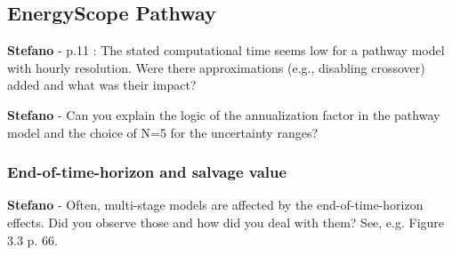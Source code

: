 \documentclass[12pt,a4paper]{article}
\begin{document}
\subsection{EnergyScope Pathway}
\label{ESPathway}
\begin{mdframed}[style=comment] %
{\color{orange} \textbf{Stefano}} - p.11 : The stated computational time seems low for a pathway model with hourly resolution. Were there approximations (e.g., disabling crossover) added and what was their impact?\end{mdframed}

\noindent 

\begin{mdframed}[style=manuscript] %

\end{mdframed}

\begin{mdframed}[style=comment] %
{\color{orange} \textbf{Stefano}} - Can you explain the logic of the annualization factor in the pathway model and the choice of N=5 for the uncertainty ranges?
\end{mdframed}

\noindent 

\begin{mdframed}[style=manuscript] %

\end{mdframed}

\subsubsection{End-of-time-horizon and salvage value}


\begin{mdframed}[style=comment] %
{\color{orange} \textbf{Stefano}} - Often, multi-stage models are affected by the end-of-time-horizon effects. Did you observe those and how did you deal with them? See, e.g. Figure 3.3 p. 66.
\end{mdframed}


\begin{mdframed}[style=manuscript] %

\end{mdframed}
\end{document}
